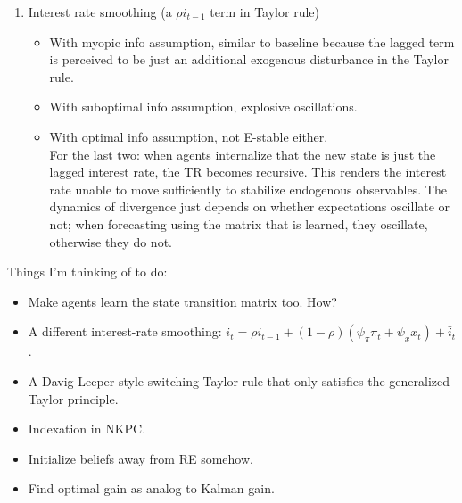 \documentclass[11pt]{article}
\renewcommand{\[}{\begin{equation}}
\renewcommand{\]}{\end{equation}}
\begin{document}
\begin{enumerate}
\begin{enumerate}
\item Interest rate smoothing (a $\rho i_{t-1}$ term in Taylor rule)
\begin{itemize}
\item With myopic info assumption, similar to baseline because the lagged term is perceived to be just an additional exogenous disturbance in the Taylor rule.
\item With suboptimal info assumption, explosive oscillations.
\item With optimal info assumption, not E-stable either.  \\
For the last two: when agents internalize that the new state is just the lagged interest rate, the TR becomes recursive. This renders the interest rate unable to move sufficiently to stabilize endogenous observables. The dynamics of divergence just depends on whether expectations oscillate or not; when forecasting using the matrix that is learned, they oscillate, otherwise they do not. 
\end{itemize}
\end{enumerate}
\end{enumerate}

Things I'm thinking of to do:
\begin{itemize}
\item Make agents learn the state transition matrix too. How?
\item A different interest-rate smoothing: $i_t = \rho i_{t-1} + (1-\rho)(\psi_{\pi}\pi_t + \psi_x x_t) + \bar{i}_t$.
\item A Davig-Leeper-style switching Taylor rule that only satisfies the generalized Taylor principle.
\item Indexation in NKPC.
\item Initialize beliefs away from RE somehow.
\item Find optimal gain as analog to Kalman gain.
\end{itemize}
\end{document}
